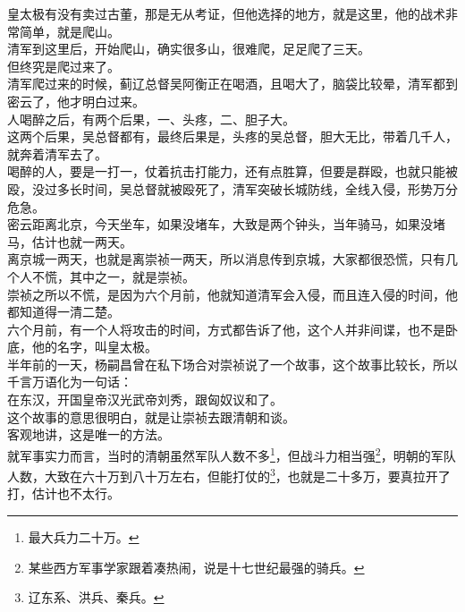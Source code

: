 \begin{multicols}{\theparacolNo}
皇太极有没有卖过古董，那是无从考证，但他选择的地方，就是这里，他的战术非常简单，就是爬山。\\

清军到这里后，开始爬山，确实很多山，很难爬，足足爬了三天。\\

但终究是爬过来了。\\

清军爬过来的时候，蓟辽总督吴阿衡正在喝酒，且喝大了，脑袋比较晕，清军都到密云了，他才明白过来。\\

人喝醉之后，有两个后果，一、头疼，二、胆子大。\\

这两个后果，吴总督都有，最终后果是，头疼的吴总督，胆大无比，带着几千人，就奔着清军去了。\\

喝醉的人，要是一打一，仗着抗击打能力，还有点胜算，但要是群殴，也就只能被殴，没过多长时间，吴总督就被殴死了，清军突破长城防线，全线入侵，形势万分危急。\\

密云距离北京，今天坐车，如果没堵车，大致是两个钟头，当年骑马，如果没堵马，估计也就一两天。\\

离京城一两天，也就是离崇祯一两天，所以消息传到京城，大家都很恐慌，只有几个人不慌，其中之一，就是崇祯。\\

崇祯之所以不慌，是因为六个月前，他就知道清军会入侵，而且连入侵的时间，他都知道得一清二楚。\\

六个月前，有一个人将攻击的时间，方式都告诉了他，这个人并非间谍，也不是卧底，他的名字，叫皇太极。\\

半年前的一天，杨嗣昌曾在私下场合对崇祯说了一个故事，这个故事比较长，所以千言万语化为一句话：\\

在东汉，开国皇帝汉光武帝刘秀，跟匈奴议和了。\\

这个故事的意思很明白，就是让崇祯去跟清朝和谈。\\

客观地讲，这是唯一的方法。\\

就军事实力而言，当时的清朝虽然军队人数不多\footnote{最大兵力二十万。}，但战斗力相当强\footnote{某些西方军事学家跟着凑热闹，说是十七世纪最强的骑兵。}，明朝的军队人数，大致在六十万到八十万左右，但能打仗的\footnote{辽东系、洪兵、秦兵。}，也就是二十多万，要真拉开了打，估计也不太行。\\


\end{multicols}
